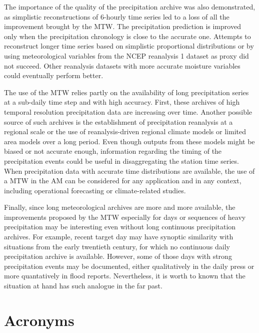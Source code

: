 \documentclass[hess, manuscript]{copernicus}
\begin{document}
	The importance of the quality of the precipitation archive was also demonstrated, as simplistic reconstructions of 6-hourly time series led to a loss of all the improvement brought by the MTW. The precipitation prediction is improved only when the precipitation chronology is close to the accurate one. Attempts to reconstruct longer time series based on simplistic proportional distributions or by using meteorological variables from the NCEP reanalysis 1 dataset as proxy did not succeed. Other reanalysis datasets with more accurate moisture variables could eventually perform better.
	
	The use of the MTW relies partly on the availability of long precipitation series at a sub-daily time step and with high accuracy. First, these archives of high temporal resolution precipitation data are increasing over time. Another possible source of such archives is the establishment of precipitation reanalysis at a regional scale or the use of reanalysis-driven regional climate models or limited area models over a long period. Even though outputs from these models might be biased or not accurate enough, information regarding the timing of the precipitation events could be useful in disaggregating the station time series. When precipitation data with accurate time distributions are available, the use of a MTW in the AM can be considered for any application and in any context, including operational forecasting or climate-related studies.
	
	Finally, since long meteorological archives are more and more available, the improvements proposed by the MTW especially for days or sequences of heavy precipitation may be interesting even without long continuous precipitation archives. For example, recent target day may have synoptic similarity with situations from the early twentieth century, for which no continuous daily precipitation archive is available. However, some of those days with strong precipitation events may be documented, either qualitatively in the daily press or more quantatively in flood reports. Nevertheless, it is worth to known that the situation at hand has such analogue in the far past.
	
	
	\appendix
	\section{Acronyms}    %
	
\end{document}
